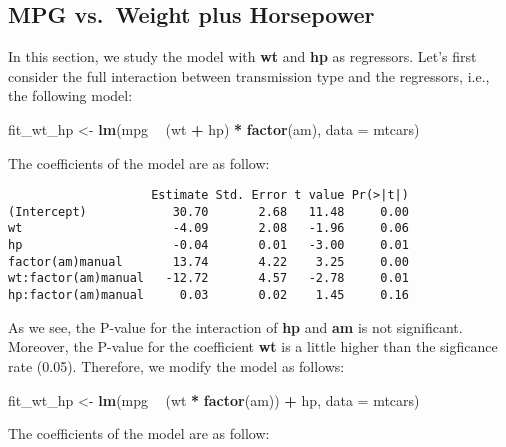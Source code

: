 \documentclass[]{article}
\newenvironment{Shaded}{\begin{snugshade}}{\end{snugshade}}
\newcommand{\KeywordTok}[1]{\textcolor[rgb]{0.13,0.29,0.53}{\textbf{#1}}}
\newcommand{\DataTypeTok}[1]{\textcolor[rgb]{0.13,0.29,0.53}{#1}}
\newcommand{\StringTok}[1]{\textcolor[rgb]{0.31,0.60,0.02}{#1}}
\newcommand{\OperatorTok}[1]{\textcolor[rgb]{0.81,0.36,0.00}{\textbf{#1}}}
\newcommand{\NormalTok}[1]{#1}
\begin{document}
\hypertarget{sec-fit-wthp}{\subsection{MPG vs.~Weight plus
Horsepower}\label{sec-fit-wthp}}

In this section, we study the model with \textbf{wt} and \textbf{hp} as
regressors. Let's first consider the full interaction between
transmission type and the regressors, i.e., the following model:

\begin{Shaded}
\begin{Highlighting}[]
\NormalTok{fit_wt_hp <-}\StringTok{ }\KeywordTok{lm}\NormalTok{(mpg }\OperatorTok{~}\StringTok{ }\NormalTok{(wt }\OperatorTok{+}\StringTok{ }\NormalTok{hp) }\OperatorTok{*}\StringTok{ }\KeywordTok{factor}\NormalTok{(am), }\DataTypeTok{data =}\NormalTok{ mtcars)}
\end{Highlighting}
\end{Shaded}

The coefficients of the model are as follow:

\begin{verbatim}
                    Estimate Std. Error t value Pr(>|t|)
(Intercept)            30.70       2.68   11.48     0.00
wt                     -4.09       2.08   -1.96     0.06
hp                     -0.04       0.01   -3.00     0.01
factor(am)manual       13.74       4.22    3.25     0.00
wt:factor(am)manual   -12.72       4.57   -2.78     0.01
hp:factor(am)manual     0.03       0.02    1.45     0.16
\end{verbatim}

As we see, the P-value for the interaction of \textbf{hp} and
\textbf{am} is not significant. Moreover, the P-value for the
coefficient \textbf{wt} is a little higher than the sigficance rate
(0.05). Therefore, we modify the model as follows:

\begin{Shaded}
\begin{Highlighting}[]
\NormalTok{fit_wt_hp <-}\StringTok{ }\KeywordTok{lm}\NormalTok{(mpg }\OperatorTok{~}\StringTok{ }\NormalTok{(wt }\OperatorTok{*}\StringTok{ }\KeywordTok{factor}\NormalTok{(am)) }\OperatorTok{+}\StringTok{ }\NormalTok{hp, }\DataTypeTok{data =}\NormalTok{ mtcars)}
\end{Highlighting}
\end{Shaded}

The coefficients of the model are as follow:
\end{document}
